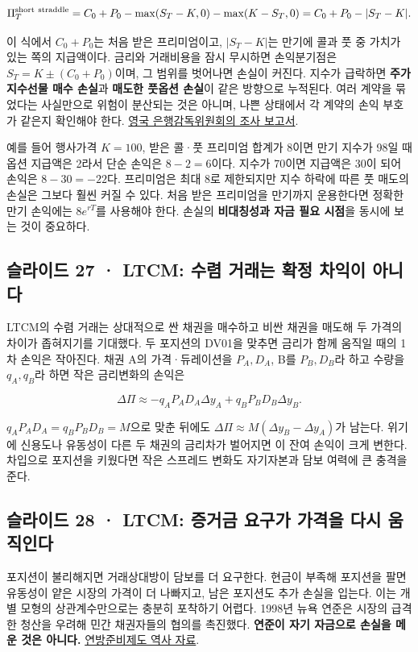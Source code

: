 \documentclass[11pt,a4paper]{article}
\begin{document}
\[
\Pi_T^{\rm short\ straddle}=C_0+P_0-\max(S_T-K,0)-\max(K-S_T,0)
=C_0+P_0-|S_T-K|.
\]

이 식에서 $C_0+P_0$는 처음 받은 프리미엄이고, $|S_T-K|$는 만기에 콜과 풋 중 가치가 있는 쪽의 지급액이다. 금리와 거래비용을 잠시 무시하면 손익분기점은 $S_T=K\pm(C_0+P_0)$이며, 그 범위를 벗어나면 손실이 커진다. 지수가 급락하면 \textbf{주가지수선물 매수 손실}과 \textbf{매도한 풋옵션 손실}이 같은 방향으로 누적된다. 여러 계약을 묶었다는 사실만으로 위험이 분산되는 것은 아니며, 나쁜 상태에서 각 계약의 손익 부호가 같은지 확인해야 한다. \href{https://www.gov.uk/government/publications/report-into-the-collapse-of-barings-bank}{영국 은행감독위원회의 조사 보고서}.\par

예를 들어 행사가격 $K=100$, 받은 콜·풋 프리미엄 합계가 8이면 만기 지수가 98일 때 옵션 지급액은 2라서 단순 손익은 $8-2=6$이다. 지수가 70이면 지급액은 30이 되어 손익은 $8-30=-22$다. 프리미엄은 최대 8로 제한되지만 지수 하락에 따른 풋 매도의 손실은 그보다 훨씬 커질 수 있다. 처음 받은 프리미엄을 만기까지 운용한다면 정확한 만기 손익에는 $8e^{rT}$를 사용해야 한다. 손실의 \textbf{비대칭성과 자금 필요 시점}을 동시에 보는 것이 중요하다.\par

\subsection{슬라이드 27 · LTCM: 수렴 거래는 확정 차익이 아니다}
LTCM의 수렴 거래는 상대적으로 싼 채권을 매수하고 비싼 채권을 매도해 두 가격의 차이가 좁혀지기를 기대했다. 두 포지션의 DV01을 맞추면 금리가 함께 움직일 때의 1차 손익은 작아진다. 채권 A의 가격·듀레이션을 $P_A,D_A$, B를 $P_B,D_B$라 하고 수량을 $q_A,q_B$라 하면 작은 금리변화의 손익은\par

\[
\Delta\Pi\approx-q_AP_AD_A\Delta y_A+q_BP_BD_B\Delta y_B.
\]

$q_AP_AD_A=q_BP_BD_B=M$으로 맞춘 뒤에도 $\Delta\Pi\approx M(\Delta y_B-\Delta y_A)$가 남는다. 위기에 신용도나 유동성이 다른 두 채권의 금리차가 벌어지면 이 잔여 손익이 크게 변한다. 차입으로 포지션을 키웠다면 작은 스프레드 변화도 자기자본과 담보 여력에 큰 충격을 준다.\par

\subsection{슬라이드 28 · LTCM: 증거금 요구가 가격을 다시 움직인다}
포지션이 불리해지면 거래상대방이 담보를 더 요구한다. 현금이 부족해 포지션을 팔면 유동성이 얕은 시장의 가격이 더 나빠지고, 남은 포지션도 추가 손실을 입는다. 이는 개별 모형의 상관계수만으로는 충분히 포착하기 어렵다. 1998년 뉴욕 연준은 시장의 급격한 청산을 우려해 민간 채권자들의 협의를 촉진했다. \textbf{연준이 자기 자금으로 손실을 메운 것은 아니다.} \href{https://www.federalreservehistory.org/essays/ltcm-near-failure}{연방준비제도 역사 자료}.\par
\end{document}
